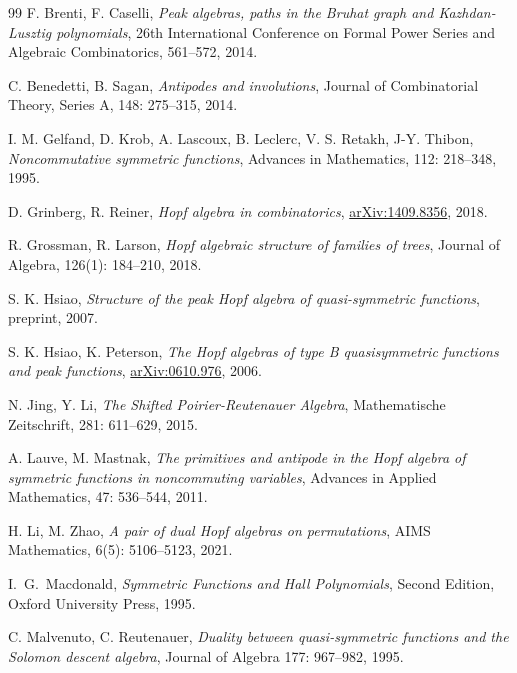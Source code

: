 \documentclass[12pt]{amsart}
\numberwithin{equation}{section}
\begin{document}
\begin{thebibliography}{99}
	 F. Brenti, F. Caselli,
	\newblock \textit{Peak algebras, paths in the Bruhat graph and Kazhdan-Lusztig polynomials},
	\newblock 26th International Conference on Formal Power Series and Algebraic Combinatorics, 561--572, 2014.
	
	 C. Benedetti, B. Sagan,
	\newblock \textit{Antipodes and involutions},
	\newblock Journal of Combinatorial Theory, Series A, 148: 275--315, 2014.
	
	 I. M. Gelfand, D. Krob, A. Lascoux, B. Leclerc, V. S. Retakh, J-Y. Thibon,
	\newblock \textit{Noncommutative symmetric functions},
	\newblock Advances in Mathematics, 112: 218--348, 1995.

	 D. Grinberg, R. Reiner,
	\newblock \textit{Hopf algebra in combinatorics}, 
	\newblock \href{https://arxiv.org/abs/1409.8356}{arXiv:1409.8356}, 2018.
	
	 R. Grossman, R. Larson,
	\newblock \textit{Hopf algebraic structure of families of trees}, 
	\newblock Journal of Algebra, 126(1): 184--210, 2018.
	
	 S. K. Hsiao,
	\newblock \textit{Structure of the peak Hopf algebra of quasi-symmetric functions},
	\newblock preprint, 2007.
	
	 S. K. Hsiao, K. Peterson,
	\newblock \textit{The Hopf algebras of type B quasisymmetric functions and peak functions},
	\newblock \href{https://arxiv.org/abs/math/0610.976}{arXiv:0610.976}, 2006.
	
	 N. Jing, Y. Li,
	\newblock \textit{The Shifted Poirier-Reutenauer Algebra},
	\newblock Mathematische Zeitschrift, 281: 611--629, 2015.	
	
	 A. Lauve, M. Mastnak,
	\newblock \textit{The primitives and antipode in the Hopf algebra of symmetric functions in noncommuting variables},
	\newblock Advances in Applied Mathematics, 47: 536--544, 2011.	
	
	 H. Li, M. Zhao,
	\newblock \textit{A pair of dual Hopf algebras on permutations},
	\newblock AIMS Mathematics, 6(5): 5106--5123, 2021.	
	
	 I.~G.~Macdonald,
	\newblock \textit{Symmetric Functions and Hall Polynomials},
	\newblock Second Edition, Oxford University Press, 1995.

	 C. Malvenuto, C. Reutenauer,
	\newblock \textit{Duality between quasi-symmetric functions and the Solomon descent algebra},
	\newblock Journal of Algebra 177: 967--982, 1995.
	

\end{thebibliography}
\end{document}
